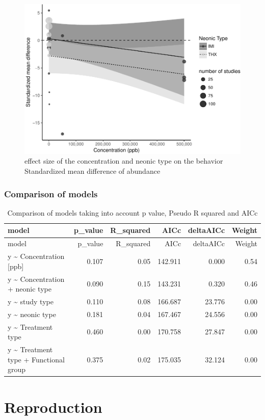 \documentclass[]{elsarticle} %
\makeatletter
\def\maxwidth{\ifdim\Gin@nat@width>\linewidth\linewidth
\else\Gin@nat@width\fi}
\let\Oldincludegraphics\includegraphics
\renewcommand{\includegraphics}[1]{\Oldincludegraphics[width=\maxwidth]{#1}}
\makeatother
\begin{document}
\begin{figure}[htbp]
\centering
\includegraphics{MetanalysisNeonics_files/figure-latex/unnamed-chunk-20-1.pdf}
\caption{effect size of the concentration and neonic type on the
behavior Standardized mean difference of abundance}
\end{figure}

\subsubsection{Comparison of models}\label{comparison-of-models-1}

\begin{longtable}[c]{@{}lrrrrr@{}}
\caption{Comparison of models taking into account p value, Pseudo R
squared and AICc}\tabularnewline
\toprule
model & p\_value & R\_squared & AICc & deltaAICc & Weight\tabularnewline
\midrule
\endfirsthead
\toprule
model & p\_value & R\_squared & AICc & deltaAICc & Weight\tabularnewline
\midrule
\endhead
y \textasciitilde{} Concentration {[}ppb{]} & 0.107 & 0.05 & 142.911 &
0.000 & 0.54\tabularnewline
y \textasciitilde{} Concentration + neonic type & 0.090 & 0.15 & 143.231
& 0.320 & 0.46\tabularnewline
y \textasciitilde{} study type & 0.110 & 0.08 & 166.687 & 23.776 &
0.00\tabularnewline
y \textasciitilde{} neonic type & 0.181 & 0.04 & 167.467 & 24.556 &
0.00\tabularnewline
y \textasciitilde{} Treatment type & 0.460 & 0.00 & 170.758 & 27.847 &
0.00\tabularnewline
y \textasciitilde{} Treatment type + Functional group & 0.375 & 0.02 &
175.035 & 32.124 & 0.00\tabularnewline
\bottomrule
\end{longtable}

\section{Reproduction}\label{reproduction}
\end{document}
